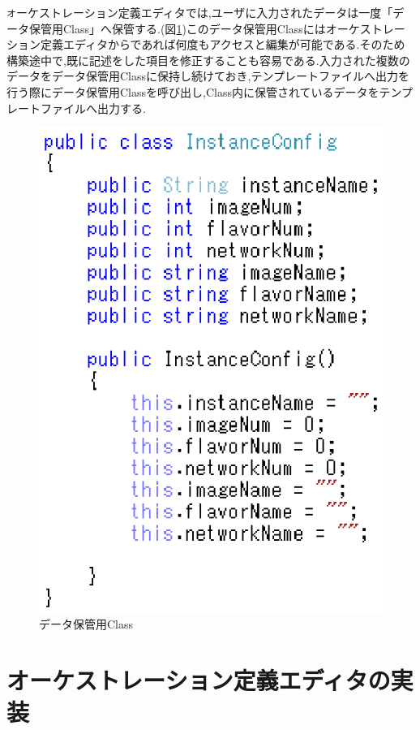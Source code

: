 \documentclass[mingoth]{kut-paper}		%
\begin{document}
	\texttt オーケストレーション定義エディタでは,ユーザに入力されたデータは一度「データ保管用Class」へ保管する.(図\ref{graf:3})このデータ保管用Classにはオーケストレーション定義エディタからであれば何度もアクセスと編集が可能である.そのため構築途中で,既に記述をした項目を修正することも容易である.入力された複数のデータをデータ保管用Classに保持し続けておき,テンプレートファイルへ出力を行う際にデータ保管用Classを呼び出し,Class内に保管されているデータをテンプレートファイルへ出力する.
	
	\begin{figure}[H]
		\begin{center}
			\includegraphics[scale=0.86]{Document/Source1.eps}
			\caption{データ保管用Class}
			\label{graf:3}
		\end{center}
	\end{figure}
	
\chapter{オーケストレーション定義エディタの実装}
\end{document}
